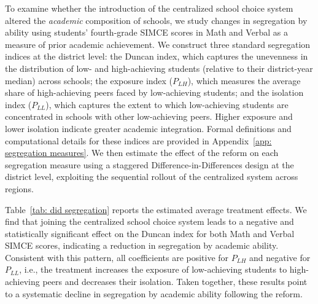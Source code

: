 To examine whether the introduction of the centralized school choice system altered the \emph{academic} composition of schools, we study changes in segregation by ability using students' fourth-grade SIMCE scores in Math and Verbal as a measure of prior academic achievement. We construct three standard segregation indices at the district level: the Duncan index, which captures the unevenness in the distribution of low- and high-achieving students (relative to their district-year median) across schools; the exposure index ($P_{LH}$), which measures the average share of high-achieving peers faced by low-achieving students; and the isolation index ($P_{LL}$), which captures the extent to which low-achieving students are concentrated in schools with other low-achieving peers. Higher exposure and lower isolation indicate greater academic integration. Formal definitions and computational details for these indices are provided in Appendix~\ref{app: segregation measures}. We then estimate the effect of the reform on each segregation measure using a staggered Difference-in-Differences design at the district level, exploiting the sequential rollout of the centralized system across regions.

Table~\ref{tab: did segregation} reports the estimated average treatment effects. We find that joining the centralized school choice system leads to a negative and statistically significant effect on the Duncan index for both Math and Verbal SIMCE scores, indicating a reduction in segregation by academic ability. Consistent with this pattern, all coefficients are positive for $P_{LH}$ and negative for $P_{LL}$, i.e., the treatment increases the exposure of low-achieving students to high-achieving peers and decreases their isolation.
Taken together, these results point to a systematic decline in segregation by academic ability following the reform. 



